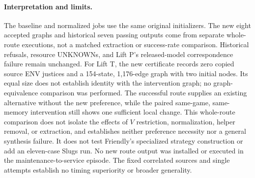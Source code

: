 \paragraph{Interpretation and limits.}
The baseline and normalized jobs use the same original initializers.
The new eight accepted graphs and historical seven passing outputs come
from separate whole-route executions, not a matched extraction or
success-rate comparison. Historical refusals, resource UNKNOWNs, and
Lift P's released-model correspondence failure remain unchanged.
For Lift T, the new certificate records zero copied source ENV justices
and a 154-state, 1,176-edge graph with two initial nodes. Its equal size
does not establish identity with the intervention graph; no graph-equivalence
comparison was performed. The successful route supplies an existing
alternative without the new preference, while the paired same-game,
same-memory intervention still shows one sufficient local change.
This whole-route comparison does not isolate the effects of $V$ restriction,
normalization, helper removal, or extraction, and establishes
neither preference necessity nor a general synthesis failure.
It does not test Friendly's specialized strategy construction or add an
eleven-case Slugs run. No new route output was installed or executed in
the maintenance-to-service episode. The fixed correlated sources and
single attempts establish no timing superiority or broader generality.
